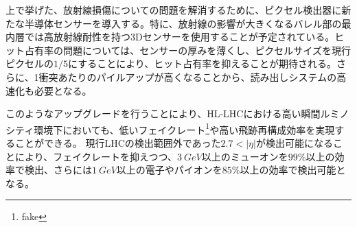 上で挙げた、放射線損傷についての問題を解消するために、ピクセル検出器に新たな半導体センサーを導入する。特に、放射線の影響が大きくなるバレル部の最内層では高放射線耐性を持つ3Dセンサーを使用することが予定されている。ヒット占有率の問題については、センサーの厚みを薄くし、ピクセルサイズを現行ピクセルの$1/5$にすることにより、ヒット占有率を抑えることが期待される。さらに、1衝突あたりのパイルアップが高くなることから、読み出しシステムの高速化も必要となる。


このようなアップグレードを行うことにより、HL-LHCにおける高い瞬間ルミノシティ環境下においても、低いフェイクレート\footnote{fake}や高い飛跡再構成効率を実現することができる。
現行LHCの検出範囲外であった$2.7<|\eta|$が検出可能になることにより、フェイクレートを抑えつつ、$3\ \si{GeV}$以上のミューオンを$99\si{\%}$以上の効率で検出、さらには$1\ \si{GeV}$以上の電子やパイオンを$85\si{\%}$以上の効率で検出可能となる。


\newpage
